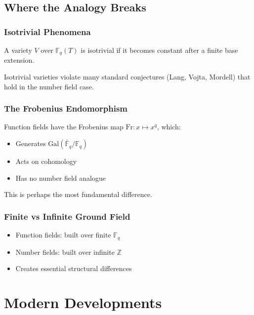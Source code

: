 \subsection{Where the Analogy Breaks}

\subsubsection{Isotrivial Phenomena}

\begin{definition}
A variety $V$ over $\mathbb{F}_q(T)$ is isotrivial if it becomes constant after a finite base extension.
\end{definition}

\begin{theorem}
Isotrivial varieties violate many standard conjectures (Lang, Vojta, Mordell) that hold in the number field case.
\end{theorem}

\subsubsection{The Frobenius Endomorphism}

Function fields have the Frobenius map $\text{Fr}: x \mapsto x^q$, which:
\begin{itemize}
\item Generates $\text{Gal}(\bar{\mathbb{F}}_q/\mathbb{F}_q)$
\item Acts on cohomology
\item Has no number field analogue
\end{itemize}

This is perhaps the most fundamental difference.

\subsubsection{Finite vs Infinite Ground Field}

\begin{itemize}
\item Function fields: built over finite $\mathbb{F}_q$
\item Number fields: built over infinite $\mathbb{Z}$
\item Creates essential structural differences
\end{itemize}

\section{Modern Developments}
\label{sec:modern}

